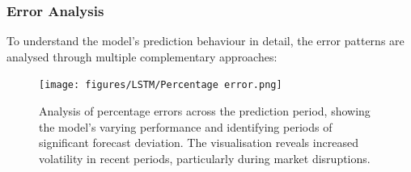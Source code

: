 \documentclass[12pt,a4paper]{report}
\begin{document}
\subsubsection{Error Analysis}
To understand the model's prediction behaviour in detail, the error patterns are analysed through multiple complementary approaches:

\begin{figure}[htbp]
\centering
\texttt{[image: figures/LSTM/Percentage error.png]}
\caption{Analysis of percentage errors across the prediction period, showing the model's varying performance and identifying periods of significant forecast deviation. The visualisation reveals increased volatility in recent periods, particularly during market disruptions.}
\label{fig:percentage_error}
\end{figure}
\end{document}

